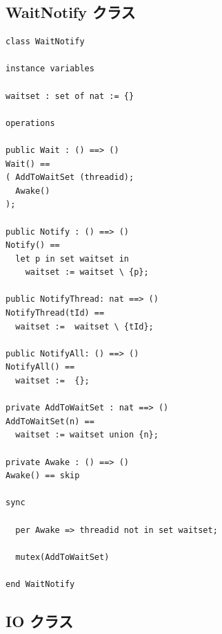 \documentclass[\pformat,12pt]{jreport}
\begin{document}
\subsection{WaitNotify クラス}

\begin{lstlisting}
class WaitNotify

instance variables

waitset : set of nat := {}

operations

public Wait : () ==> ()
Wait() ==
( AddToWaitSet (threadid);
  Awake()
);

public Notify : () ==> ()
Notify() ==
  let p in set waitset in
    waitset := waitset \ {p};

public NotifyThread: nat ==> ()
NotifyThread(tId) ==
  waitset :=  waitset \ {tId};

public NotifyAll: () ==> ()
NotifyAll() ==
  waitset :=  {};

private AddToWaitSet : nat ==> ()
AddToWaitSet(n) ==
  waitset := waitset union {n};

private Awake : () ==> ()
Awake() == skip

sync

  per Awake => threadid not in set waitset;

  mutex(AddToWaitSet)

end WaitNotify
\end{lstlisting}

\subsection{IO クラス}
\end{document}

